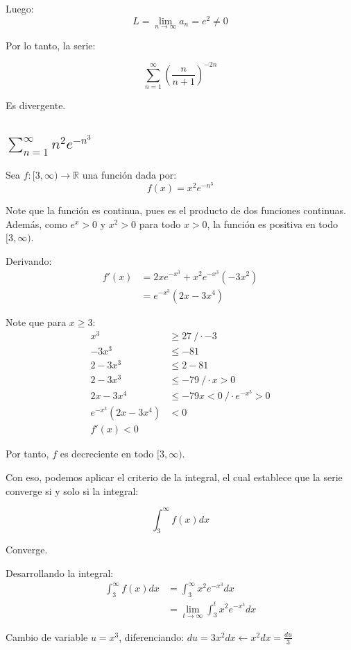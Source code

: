 \documentclass{article}
\begin{document}
Luego:
\[
L = \lim_{n \to \infty} a_n = e^2 \neq 0
\]

Por lo tanto, la serie:

\[
\sum_{n = 1}^{\infty} \left( \frac{n}{n + 1} \right)^{-2n} 
\]

Es divergente.

\subsection{$\sum_{n = 1}^{\infty} n^2 e^{-n^3}$}

Sea $f: [3, \infty) \to \mathbb{R} $ una función dada por:
\[
f(x) = x^2 e^{-n^3}
\]

Note que la función es continua, pues es el producto de dos funciones continuas. Además, como $e^x > 0$ y $x^2 > 0$ para todo $x > 0$, la función es positiva en todo $[3, \infty)$.

Derivando:
\begin{align*}
f'(x) &= 2x e^{-x^3} + x^2 e^{-x^3} (-3x^2) \\
&= e^{-x^3} (2x - 3x^4)
\end{align*}

Note que para $x \geq 3$:
\begin{align*}
x^3 &\geq 27 \ / \cdot -3 \\
-3 x^3 &\leq -81 \\
2 - 3 x^3 &\leq 2 - 81 \\
2 - 3 x^3 &\leq -79 \ / \cdot x > 0 \\
2x - 3 x^4 &\leq -79x < 0 \ / \cdot e^{-x^3} > 0 \\
e^{-x^3} (2x - 3 x^4) &< 0 \\
f'(x) < 0
\end{align*}

Por tanto, $f$ es decreciente en todo $[3, \infty)$.

Con eso, podemos aplicar el criterio de la integral, el cual establece que la serie converge si y solo si la integral:

\[
\int_{3}^{\infty} f(x)dx
\]

Converge.

Desarrollando la integral:
\begin{align*}
\int_{3}^{\infty} f(x)dx &= \int_{3}^{\infty} x^2 e^{-x^3}dx \\
&= \lim_{t \to \infty} \int_{3}^{t} x^2 e^{-x^3}dx
\end{align*}

Cambio de variable $u = x^3$, diferenciando: $du = 3x^2 dx \leftarrow x^2 dx = \frac{du}{3}$
\end{document}
